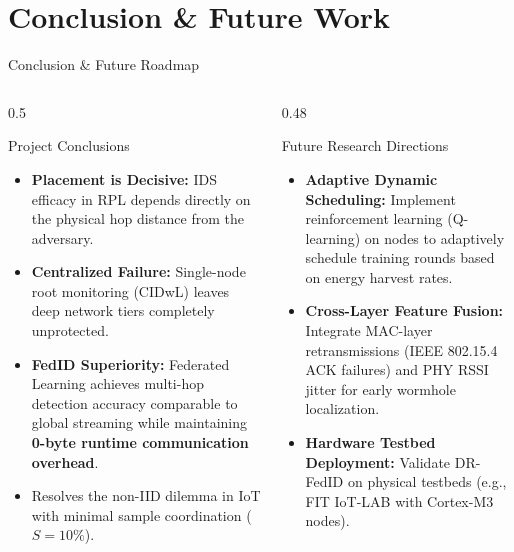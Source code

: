 \documentclass[aspectratio=169, 10pt]{beamer}
\begin{document}
\section{Conclusion \& Future Work}
\begin{frame}{Conclusion \& Future Roadmap}
  \begin{columns}[T]
    \begin{column}{0.5\textwidth}
      \begin{block}{Project Conclusions}
        \begin{itemize}\footnotesize
          \item \textbf{Placement is Decisive:} IDS efficacy in RPL depends directly on the physical hop distance from the adversary.
          \item \textbf{Centralized Failure:} Single-node root monitoring (CIDwL) leaves deep network tiers completely unprotected.
          \item \textbf{FedID Superiority:} Federated Learning achieves multi-hop detection accuracy comparable to global streaming while maintaining \textbf{0-byte runtime communication overhead}.
          \item Resolves the non-IID dilemma in IoT with minimal sample coordination ($S=10\%$).
        \end{itemize}
      \end{block}
    \end{column}
    \begin{column}{0.48\textwidth}
      \begin{block}{Future Research Directions}
        \begin{itemize}\footnotesize
          \item \textbf{Adaptive Dynamic Scheduling:} Implement reinforcement learning (Q-learning) on nodes to adaptively schedule training rounds based on energy harvest rates.
          \item \textbf{Cross-Layer Feature Fusion:} Integrate MAC-layer retransmissions (IEEE 802.15.4 ACK failures) and PHY RSSI jitter for early wormhole localization.
          \item \textbf{Hardware Testbed Deployment:} Validate DR-FedID on physical testbeds (e.g., FIT IoT-LAB with Cortex-M3 nodes).
        \end{itemize}
      \end{block}
    \end{column}
  \end{columns}
\end{frame}
\end{document}
